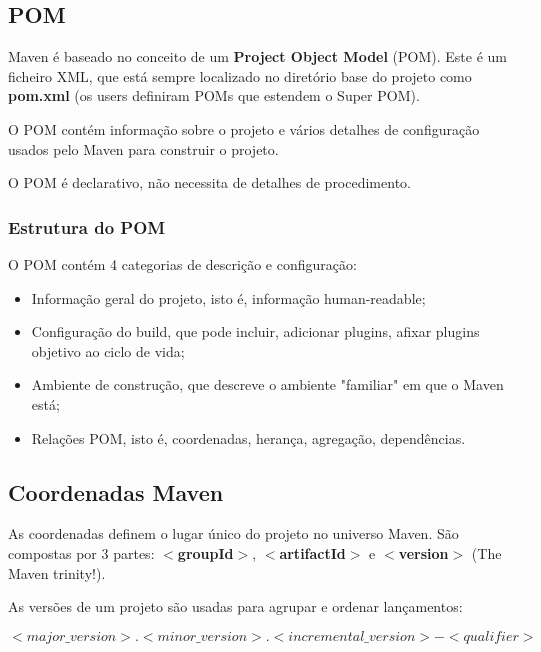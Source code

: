 \documentclass{article}
\begin{document}
\subsection{POM}

Maven é baseado no conceito de um \textbf{Project Object Model} (POM).
Este é um ficheiro XML, que está sempre localizado no diretório base do projeto
como \textbf{pom.xml} (os users definiram POMs que estendem o Super POM).

O POM contém informação sobre o projeto e vários detalhes de configuração
usados pelo Maven para construir o projeto.

O POM é declarativo, não necessita de detalhes de procedimento.

\subsubsection{Estrutura do POM}

\begin{flushleft}
  O POM contém 4 categorias de descrição e configuração:
  
  \begin{itemize}
    \item Informação geral do projeto, isto é, informação human-readable;
    \item Configuração do build, que pode incluir, adicionar plugins,
    afixar plugins objetivo ao ciclo de vida;
    \item Ambiente de construção, que descreve o ambiente "familiar" em que o Maven está;
    \item Relações POM, isto é, coordenadas, herança, agregação, dependências.
  \end{itemize}
\end{flushleft}

\pagebreak

\subsection{Coordenadas Maven}

As coordenadas definem o lugar único do projeto no universo Maven.
São compostas por 3 partes: \textbf{$<$groupId$>$}, \textbf{$<$artifactId$>$} e
\textbf{$<$version$>$} (The Maven trinity!).

\vspace{2mm}

As versões de um projeto são usadas para agrupar e ordenar lançamentos:

\[ <major\_version>.<minor\_version>.<incremental\_version>-<qualifier> \]
\end{document}

